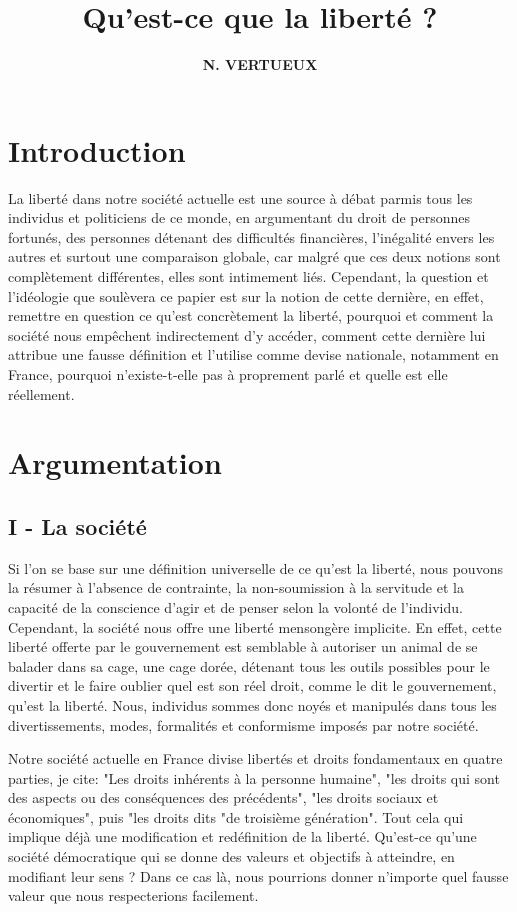 \documentclass[twocolumn, french]{article}
\author{\large{\textbf{N. VERTUEUX}}}
\title{
  \fontsize{30pt}{36pt}\selectfont \textbf{Qu'est-ce que la liberté ?}
}
\begin{document}
\maketitle
\section*{Introduction}

La liberté dans notre société actuelle est une source à débat parmis tous les individus
et politiciens de ce monde, en argumentant du droit de personnes fortunés, des personnes
détenant des difficultés financières, l'inégalité envers les autres et surtout une 
comparaison globale, car malgré que ces deux notions sont complètement différentes, elles
sont intimement liés. Cependant, la question et l'idéologie que soulèvera ce papier est 
sur la notion de cette dernière, en effet, remettre en question ce qu'est concrètement la 
liberté, pourquoi et comment la société nous empêchent indirectement d'y accéder, comment 
cette dernière lui attribue une fausse définition et l'utilise comme devise nationale, 
notamment en France, pourquoi n'existe-t-elle pas à proprement parlé et quelle est elle 
réellement. 
\section*{Argumentation}
\subsection*{I - La société}
Si l'on se base sur une définition universelle de ce qu'est la liberté, nous pouvons la 
résumer à l'absence de contrainte, la non-soumission à la servitude et la capacité de la 
conscience d'agir et de penser selon la volonté de l'individu. \\

Cependant, la société nous offre une liberté mensongère implicite. En effet, cette liberté 
offerte par le gouvernement est semblable à autoriser un animal de se balader dans sa cage, 
une cage dorée, détenant tous les outils possibles pour le divertir et le faire oublier quel 
est son réel droit, comme le dit le gouvernement, qu'est la liberté. 
Nous, individus sommes donc noyés et manipulés dans tous les divertissements, modes, 
formalités et conformisme imposés par notre société.

Notre société actuelle en France divise libertés et droits fondamentaux en quatre parties, 
je cite: "Les droits inhérents à la personne humaine", "les droits qui sont des aspects ou 
des conséquences des précédents", "les droits sociaux et économiques", puis "les droits dits 
"de troisième génération". Tout cela qui implique déjà une modification et redéfinition de la 
liberté. Qu'est-ce qu'une société démocratique qui se donne des valeurs et objectifs à 
atteindre, en modifiant leur sens ? Dans ce cas là, nous pourrions donner n'importe quel 
fausse valeur que nous respecterions facilement.
\end{document}
